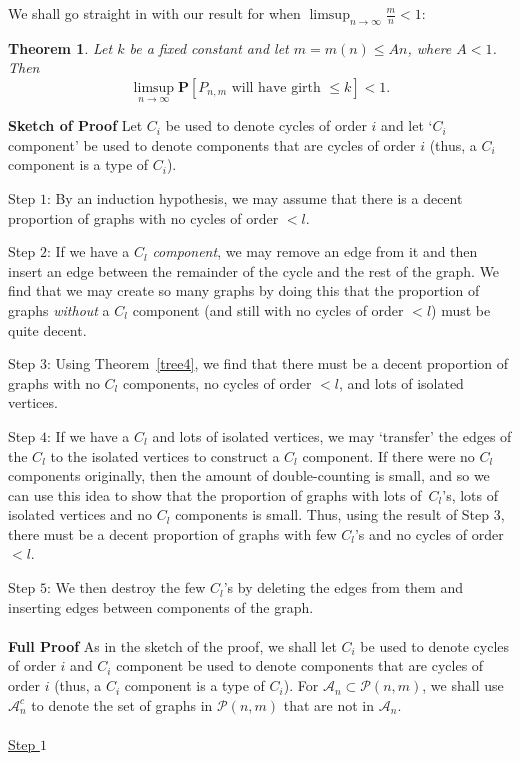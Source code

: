 \documentclass{article}
\newtheorem{Theorem}{Theorem}
\newtheorem{Proof of Theorem}{Proof of Theorem}
\begin{document}
\begin{displaymath}
\end{displaymath}

We shall go straight in with our result for when $\limsup_{n \to \infty} \frac{m}{n} < 1$:















\begin{Theorem} \label{cyc54}
Let $k$ be a fixed constant and let $m=m(n) \leq An$, where $A<1$.
Then
\begin{displaymath}
\limsup_{n \to \infty}
\mathbf{P}[P_{n,m} \textrm{ will have girth }\leq k] < 1.
\end{displaymath}
\end{Theorem}
\textbf{Sketch of Proof}
Let $C_{i}$ be used to denote cycles of order $i$ 
and let `$C_{i}$ component' be used to denote components that are cycles of order $i$
(thus, a $C_{i}$ component is a type of $C_{i}$). 

Step $1$: 
By an induction hypothesis, 
we may assume that there is a decent proportion of graphs with no cycles of order $<l$.

Step $2$:
If we have a $C_{l}$ \textit{component},
we may remove an edge from it and then insert an edge
between the remainder of the cycle and the rest of the graph.
We find that we may create so many graphs by doing this
that the proportion of graphs \textit{without} a $C_{l}$ component (and still with no cycles of order $<l$)
must be quite decent.

Step $3$: 
Using Theorem~\ref{tree4},
we find that there must be a decent proportion of graphs 
with no $C_{l}$ components, no cycles of order $<l$, and lots of isolated vertices.

Step $4$:
If we have a $C_{l}$ and lots of isolated vertices,
we may `transfer' the edges of the $C_{l}$ to the isolated vertices to construct a $C_{l}$ component.
If there were no $C_{l}$ components originally,
then the amount of double-counting is small,
and so we can use this idea to show that the proportion of graphs 
with lots of~$C_{l}$'s, lots of isolated vertices and no $C_{l}$ components is small.
Thus, using the result of Step $3$,
there must be a decent proportion of graphs with few $C_{l}$'s and no cycles of order $<l$.

Step $5$:
We then destroy the few $C_{l}$'s by deleting the edges from them and inserting edges between components of the graph. \\
\\
\textbf{Full Proof}
As in the sketch of the proof,
we shall let $C_{i}$ be used to denote cycles of order $i$ 
and $C_{i}$ component be used to denote components that are cycles of order $i$
(thus, a $C_{i}$ component is a type of $C_{i}$). 
For $\mathcal{A}_{n} \subset \mathcal{P}(n,m)$,
we shall use $\mathcal{A}_{n}^{c}$ to denote the set of graphs in $\mathcal{P}(n,m)$ that are not in $\mathcal{A}_{n}$. \\ 
\\
\underline{Step $1$}
\end{document}
